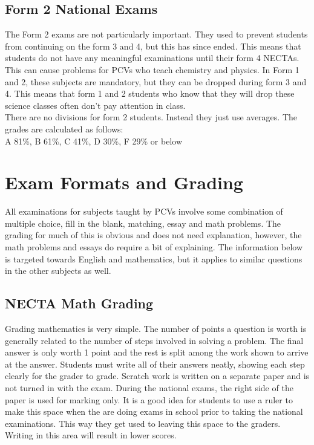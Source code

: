 \subsection{Form 2 National Exams }
      The Form 2 exams are not particularly important.  They used to prevent students from continuing on the form 3 and 4, but this has since ended.  This means that students do not have any meaningful examinations until their form 4 NECTAs. This can cause problems for PCVs who teach chemistry and physics.  In Form 1 and 2, these subjects are mandatory, but they can be dropped during form 3 and 4.  This means that form 1 and 2 students who know that they will drop these science classes often don't pay attention in class. \\

      There are no divisions for form 2 students.  Instead they just use averages.  The grades are calculated as follows:\\

      A 81\%, B 61\%, C 41\%, D 30\%, F 29\% or below\\
       
\section{Exam Formats and Grading} 

      All examinations for subjects taught by PCVs involve some combination of multiple choice, fill in the blank, matching, essay and math problems.  The grading for much of this is obvious and does not need explanation, however, the math problems and essays do require a bit of explaining.  The information below is targeted towards English and mathematics, but it applies to similar questions in the other subjects as well. 
      
\subsection{NECTA Math Grading} 
      Grading mathematics is very simple.  The number of points a question is worth is generally related to the number of steps involved in solving a problem.  The final answer is only worth 1 point and the rest is split among the work shown to arrive at the answer.  Students must write all of their answers neatly, showing each step clearly for the grader to grade.  Scratch work is written on a separate paper and is not turned in with the exam.  During the national exams, the right side of the paper is used for marking only.  It is a good idea for students to use a ruler to make this space when the are doing exams in school prior to taking the national examinations. This way they get used to leaving this space to the graders.  Writing in this area will result in lower scores. 

